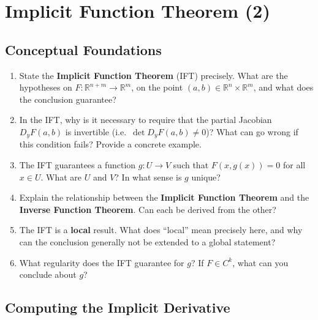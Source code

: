 \section{Implicit Function Theorem (2)}

\subsection{Conceptual Foundations}

\begin{enumerate}
  \item State the \textbf{Implicit Function Theorem} (IFT) precisely. What are the hypotheses on $F : \mathbb{R}^{n+m} \to \mathbb{R}^m$, on the point $(a, b) \in \mathbb{R}^n \times \mathbb{R}^m$, and what does the conclusion guarantee?
  \item In the IFT, why is it necessary to require that the partial Jacobian $D_y F(a,b)$ is invertible (i.e.\ $\det D_y F(a,b) \neq 0$)? What can go wrong if this condition fails? Provide a concrete example.
  \item The IFT guarantees a function $g : U \to V$ such that $F(x, g(x)) = 0$ for all $x \in U$. What are $U$ and $V$? In what sense is $g$ unique?
  \item Explain the relationship between the \textbf{Implicit Function Theorem} and the \textbf{Inverse Function Theorem}. Can each be derived from the other?
  \item The IFT is a \textbf{local} result. What does ``local'' mean precisely here, and why can the conclusion generally not be extended to a global statement?
  \item What regularity does the IFT guarantee for $g$? If $F \in C^k$, what can you conclude about $g$?
\end{enumerate}

\subsection{Computing the Implicit Derivative}

